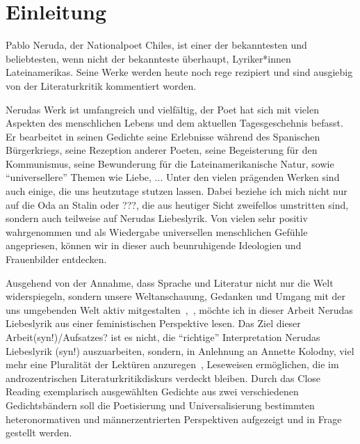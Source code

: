 \section{Einleitung}

Pablo Neruda, der Nationalpoet Chiles, ist einer der bekanntesten und beliebtesten, wenn nicht der bekannteste überhaupt, Lyriker*innen Lateinamerikas.
Seine Werke werden heute noch rege rezipiert und sind ausgiebig von der Literaturkritik kommentiert worden.


Nerudas Werk ist umfangreich und vielfältig, der Poet hat sich mit vielen Aspekten des menschlichen Lebens und dem aktuellen Tagesgeschehnis befasst.
Er bearbeitet in seinen Gedichte seine Erlebnisse während des Spanischen Bürgerkriegs, seine Rezeption anderer Poeten, seine Begeisterung für den Kommunismus, seine Bewunderung für die Lateinamerikanische Natur, sowie ``universellere'' Themen wie Liebe, ...
Unter den vielen prägenden Werken sind auch einige, die uns heutzutage stutzen lassen.
Dabei beziehe ich mich nicht nur auf die Oda an Stalin oder ???, die aus heutiger Sicht zweifellos umstritten sind, sondern auch teilweise auf Nerudas Liebeslyrik.
Von vielen sehr positiv wahrgenommen und als Wiedergabe universellen menschlichen Gefühle angepriesen, %
können wir in dieser auch beunruhigende Ideologien und Frauenbilder entdecken.


Ausgehend von der Annahme, dass Sprache und Literatur nicht nur die Welt widerspiegeln, sondern unsere Weltanschauung, Gedanken und Umgang mit der uns umgebenden Welt aktiv mitgestalten~\cite{Kolodny1980},~\cite{North2013},
möchte ich in dieser Arbeit Nerudas Liebeslyrik aus einer feministischen Perspektive lesen.
Das Ziel dieser Arbeit(syn!)/Aufsatzes? ist es nicht, die ``richtige'' Interpretation Nerudas Liebeslyrik (syn!) auszuarbeiten, sondern, in Anlehnung an Annette Kolodny, viel mehr eine Pluralität der Lektüren anzuregen~\cite{Kolodny1980}, Leseweisen ermöglichen, die im androzentrischen Literaturkritikdiskurs verdeckt bleiben.
Durch das Close Reading exemplarisch ausgewählten Gedichte aus zwei verschiedenen Gedichtsbändern soll die Poetisierung und Universalisierung bestimmten heteronormativen und männerzentrierten Perspektiven aufgezeigt und in Frage gestellt werden.


